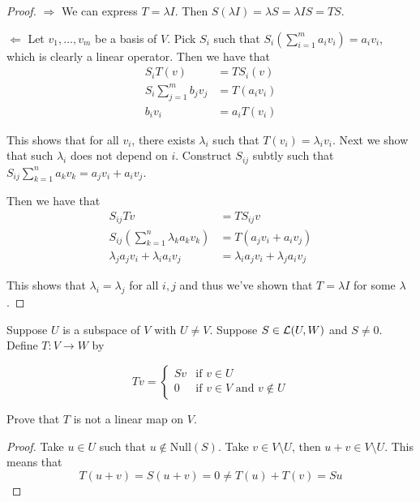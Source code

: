 \documentclass{extarticle}
\begin{document}
\begin{proof}
\(\Rightarrow\) We can express \(T = \lambda I\). Then \(S (\lambda I) = \lambda S = \lambda I S = TS\).

\(\Leftarrow\) Let \(v_1, \ldots, v_m\) be a basis of \(V\). Pick \(S_i\) such that \(S_i (\sum_{i=1}^{m}a_i v_i)
= a_i v_i\), which is clearly a linear operator. Then we have that 
\begin{align*}
    S_i T(v) &= T S_i (v) \\ 
    S_i \sum_{j=1}^{m} b_j v_j & = T(a_i v_i) \\ 
    b_i v_i &= a_i T(v_i)
\end{align*}

This shows that for all \(v_i\), there exists \(\lambda_i\) such that \(T(v_i) = \lambda_i v_i\). Next 
we show that such \(\lambda_i\) does not depend on \(i\). Construct \(S_{ij}\) subtly such that 
\(S_{ij}\sum_{k=1}^{n} a_k v_k = a_j v_i + a_i v_j\). 

Then we have that 
\begin{align*}
    S_{ij} T v &= T S_{ij} v \\ 
    S_{ij} \left(\sum_{k=1}^{n}\lambda_k a_k v_k\right) &= T(a_j v_i + a_i v_j) \\ 
    \lambda_j a_j v_i + \lambda_i a_i v_j &= \lambda_i a_j v_i + \lambda_j a_i v_j 
\end{align*}

This shows that \(\lambda_i = \lambda_j\) for all \(i,j\) and thus we've shown that \(T = \lambda I\)
for some \(\lambda\). 
\end{proof}

\begin{problem}{12}
    Suppose \(U\) is a subspace of \(V\) with \(U \neq V\). Suppose \(S \in \mathcal{L}(U, W)\)
and \(S \neq 0\). Define \(T \colon V \to W\) by 

\[Tv = \begin{cases}
    Sv & \text{if } v \in U \\ 
    0 & \text{if } v \in V \text{ and } v \notin U 
\end{cases}\]

Prove that \(T\) is not a linear map on \(V\). 
\end{problem}

\begin{proof}
Take \(u \in U\) such that \(u \notin \text{Null}(S)\). Take \(v \in V \setminus U\), then 
\(u + v \in V \setminus U\). This means that 
\[T(u + v) = S(u + v) = 0 \neq T(u) + T(v) = Su\]
\end{proof}
\end{document}
